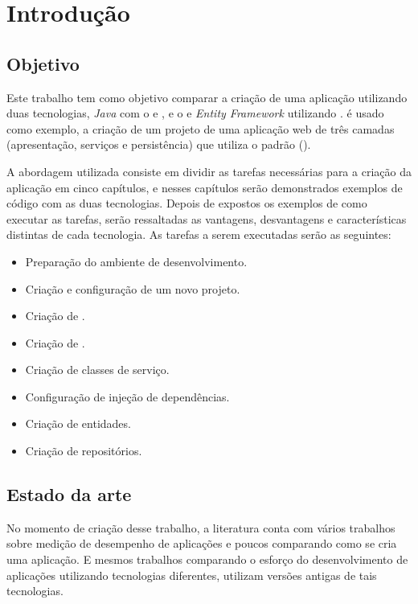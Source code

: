 \chapter{Introdução}
\label{cap:introducao}

\section{Objetivo}
\label{sec:objetivo}

Este trabalho tem como objetivo comparar a criação de uma aplicação utilizando duas tecnologias, \textit{Java} com o  e , e o  e \textit{Entity Framework} utilizando . é usado como exemplo, a criação de um projeto de uma aplicação web de três camadas (apresentação, serviços e persistência) que utiliza o padrão  ().

A abordagem utilizada consiste em dividir as tarefas necessárias para a criação da aplicação em cinco capítulos, e nesses capítulos serão demonstrados exemplos de código com as duas tecnologias. Depois de expostos os exemplos de como executar as tarefas, serão ressaltadas as vantagens, desvantagens e características distintas de cada tecnologia. As tarefas a serem executadas serão as seguintes:

\begin{itemize}
  \item Preparação do ambiente de desenvolvimento.
  \item Criação e configuração de um novo projeto.
  \item Criação de .
  \item Criação de .
  \item Criação de classes de serviço.
  \item Configuração de injeção de dependências.
  \item Criação de entidades.
  \item Criação de repositórios.
\end{itemize}

\section{Estado da arte}
\label{sec:estadoarte}
 
No momento de criação desse trabalho, a literatura conta com vários trabalhos sobre medição de desempenho de aplicações  e poucos comparando como se cria uma aplicação. E mesmos trabalhos comparando o esforço do desenvolvimento de aplicações utilizando tecnologias diferentes, utilizam versões antigas de tais tecnologias. 

